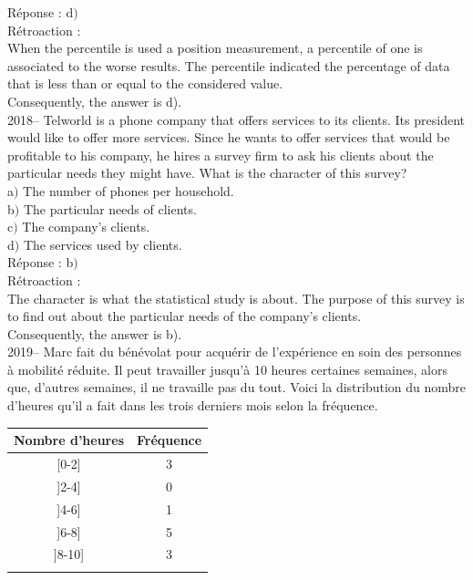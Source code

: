 \documentclass[letterpaper, 12pt]{article}
\begin{document}
R\'eponse : d$)$\\

R\'etroaction :\\
When the percentile is used a position measurement, a percentile of one is associated to the worse results. The percentile indicated the percentage of data that is less than or equal to the considered value. \\
Consequently, the answer is d).\\


2018-- Telworld is a phone company that offers services to its clients. Its president would like to offer more services. Since he wants to offer services that would be profitable to his company, he hires a survey firm to ask his clients about the particular needs they might have. What is the character of this survey? \\

a$)$ The number of phones per household.\\
b$)$ The particular needs of clients.\\
c$)$ The company's clients.\\
d$)$ The services used by clients.\\

R\'eponse : b$)$\\

R\'etroaction :\\
The character is what the statistical study is about. The purpose of this survey is to find out about the particular needs of the company's clients.\\
Consequently, the answer is b).\\

2019--  Marc fait du b\'en\'evolat pour acqu\'erir de l'exp\'erience en soin des personnes \`a mobilit\'e r\'eduite.  Il peut travailler jusqu'\`a 10 heures certaines semaines, alors que, d'autres semaines, il ne travaille pas du tout. Voici la distribution du nombre d'heures qu'il a fait dans les trois derniers mois selon la fr\'equence.\\
\begin{center}
 \begin{tabular}{|c|c|} \hline
{\bf Nombre d'heures} & {\bf Fr\'equence}  \\ \hline \hline

[0-2] & 3 \\ \hline
]2-4] & 0 \\ \hline
]4-6] & 1 \\ \hline
]6-8] & 5 \\ \hline
]8-10] & 3 \\ \hline
\multicolumn{2}{c}{}\\
\end{tabular}\\
\end{center}
\end{document}
